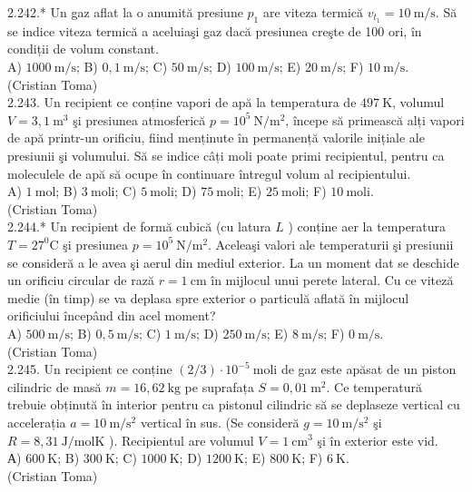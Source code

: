 \documentclass[10pt]{article}
\begin{document}
2.242.* Un gaz aflat la o anumită presiune $p_{1}$ are viteza termică $v_{t_{1}}=10 \mathrm{~m} / \mathrm{s}$. Să se indice viteza termică a aceluiaşi gaz dacă presiunea creşte de 100 ori, în condiții de volum constant.\\ A) $1000 \mathrm{~m} / \mathrm{s}$; B) $0,1 \mathrm{~m} / \mathrm{s}$; C) $50 \mathrm{~m} / \mathrm{s}$; D) $100 \mathrm{~m} / \mathrm{s}$; E) $20 \mathrm{~m} / \mathrm{s}$; F) $10 \mathrm{~m} / \mathrm{s}$.\\ (Cristian Toma)\\

2.243. Un recipient ce conține vapori de apă la temperatura de $497 \mathrm{~K}$, volumul $V=3,1 \mathrm{~m}^{3}$ şi presiunea atmosferică $p=10^{5} \mathrm{~N} / \mathrm{m}^{2}$, începe să primească alți vapori de apă printr-un orificiu, fiind menținute în permanență valorile inițiale ale presiunii şi volumului. Să se indice câți moli poate primi recipientul, pentru ca moleculele de apă să ocupe în continuare întregul volum al recipientului.\\ A) $1 \mathrm{~mol}$; B) $3 \mathrm{~moli}$; C) $5 \mathrm{~moli}$; D) $75 \mathrm{~moli}$; E) $25 \mathrm{~moli}$; F) $10 \mathrm{~moli}$.\\ (Cristian Toma)\\

2.244.* Un recipient de formă cubică (cu latura $L$ ) conține aer la temperatura $T=27^{0} \mathrm{C}$ şi presiunea $p=10^{5} \mathrm{~N} / \mathrm{m}^{2}$. Aceleaşi valori ale temperaturii şi presiunii se consideră a le avea şi aerul din mediul exterior. La un moment dat se deschide un orificiu circular de rază $r=1 \mathrm{~cm}$ în mijlocul unui perete lateral. Cu ce viteză medie (în timp) se va deplasa spre exterior o particulă aflată în mijlocul orificiului începând din acel moment?\\ A) $500 \mathrm{~m} / \mathrm{s}$; B) $0,5 \mathrm{~m} / \mathrm{s}$; C) $1 \mathrm{~m} / \mathrm{s}$; D) $250 \mathrm{~m} / \mathrm{s}$; E) $8 \mathrm{~m} / \mathrm{s}$; F) $0 \mathrm{~m} / \mathrm{s}$.\\ (Cristian Toma)\\

2.245. Un recipient ce conține $(2 / 3) \cdot 10^{-5} \mathrm{~moli}$ de gaz este apăsat de un piston cilindric de masă $m=16,62 \mathrm{~kg}$ pe suprafața $S=0,01 \mathrm{~m}^{2}$. Ce temperatură trebuie obținută în interior pentru ca pistonul cilindric să se deplaseze vertical cu accelerația $a=10 \mathrm{~m} / \mathrm{s}^{2}$ vertical în sus. (Se consideră $g=10 \mathrm{~m} / \mathrm{s}^{2}$ şi $R=8,31 \mathrm{~J} / \mathrm{molK}$ ). Recipientul are volumul $V=1 \mathrm{~cm}^{3}$ şi în exterior este vid.\\ А) $600 \mathrm{~K}$; B) $300 \mathrm{~K}$; C) $1000 \mathrm{~K}$; D) $1200 \mathrm{~K}$; E) $800 \mathrm{~K}$; F) $6 \mathrm{~K}$.\\ (Cristian Toma)\\
\end{document}
